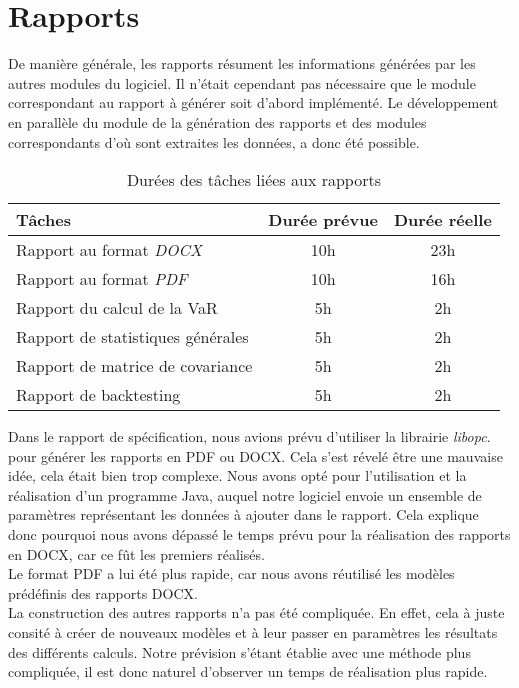 \documentclass[a4paper]{report}
\begin{document}
\section{Rapports}
De manière générale, les rapports résument les informations générées par les autres modules du logiciel. Il n'était cependant pas nécessaire que le module correspondant au rapport à générer soit d'abord implémenté. Le développement en parallèle du module de la génération des rapports et des modules correspondants d'où sont extraites les données, a donc été possible.

\begin{table}[H]
\centering
  \begin{tabularx}{0.8\textwidth}{| X | c | c |}
    \hline
	Tâches & Durée prévue & Durée réelle \\
    \hline
    Rapport au format \emph{DOCX} &  10h & 23h\\
    Rapport au format \emph{PDF} &  10h & 16h\\
    Rapport du calcul de la VaR & 5h & 2h\\
    Rapport de statistiques générales & 5h & 2h\\
    Rapport de matrice de covariance & 5h & 2h\\
    Rapport de backtesting & 5h & 2h\\
    \hline
  \end{tabularx}
  \caption{Durées des tâches liées aux rapports}
\end{table}

Dans le rapport de spécification, nous avions prévu d'utiliser la librairie \emph{libopc}. pour générer les rapports en PDF ou DOCX. Cela s'est révelé être une mauvaise idée, cela était bien trop complexe. Nous avons opté pour l'utilisation et la réalisation d'un programme Java, auquel notre logiciel envoie un ensemble de paramètres représentant les données à ajouter dans le rapport.
Cela explique donc pourquoi nous avons dépassé le temps prévu pour la réalisation des rapports en DOCX, car ce fût les premiers réalisés.\\

Le format PDF a lui été plus rapide, car nous avons réutilisé les modèles prédéfinis des rapports DOCX.\\

La construction des autres rapports n'a pas été compliquée. En effet, cela à juste consité à créer de nouveaux modèles et à leur passer en paramètres les résultats des différents calculs. Notre prévision s'étant établie avec une méthode plus compliquée, il est donc naturel d'observer un temps de réalisation plus rapide.
\end{document}
